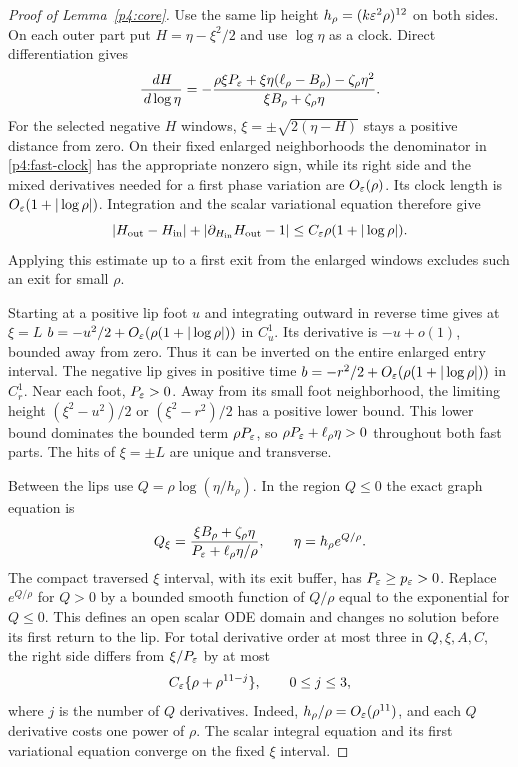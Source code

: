 \label{app:lower-core-proof}

\begin{proof}[Proof of Lemma~\ref{p4:core}]
Use the same lip height $h_\rho=(k\varepsilon^2\rho)^{12}$ on both sides.
On each outer part put $H=\eta-\xi^2/2$ and use $\log\eta$ as a clock.
Direct differentiation gives
\begin{equation}\label{p4:fast-clock}
 \frac{\,d H}{\,d\log\eta}
 =-\frac{\rho\xi P_\varepsilon+\xi\eta(\ell_\rho-B_\rho)
                    -\zeta_\rho\eta^2}
             {\xi B_\rho+\zeta_\rho\eta}.
\end{equation}
For the selected negative $H$ windows,
$\xi=\pm\sqrt{2(\eta-H)}$ stays a positive distance from zero.
On their fixed enlarged neighborhoods the denominator in
\eqref{p4:fast-clock} has the appropriate nonzero sign, while its
right side and the mixed derivatives needed for a first phase
variation are $O_\varepsilon(\rho)$. Its clock length is
$O_\varepsilon(1+|\log\rho|)$.
Integration and the scalar variational equation therefore give
\begin{equation}\label{p4:fast-error}
 |H_{\rm out}-H_{\rm in}|+
 |\partial_{H_{\rm in}}H_{\rm out}-1|
 \le C_\varepsilon\rho(1+|\log\rho|).
\end{equation}
Applying this estimate up to a first exit from the enlarged windows
excludes such an exit for small $\rho$.

Starting at a positive lip foot $u$ and integrating outward in
reverse time gives at $\xi=L$
$b=-u^2/2+O_\varepsilon(\rho(1+|\log\rho|))$ in $C^1_u$.
Its derivative is $-u+o(1)$, bounded away from zero.
Thus it can be inverted on the entire enlarged entry interval.
The negative lip gives in positive time
$b=-r^2/2+O_\varepsilon(\rho(1+|\log\rho|))$ in $C^1_r$.
Near each foot, $P_\varepsilon>0$. Away from its small foot neighborhood,
the limiting height $(\xi^2-u^2)/2$ or $(\xi^2-r^2)/2$
has a positive lower bound. This lower bound dominates the bounded
term $\rho P_\varepsilon$, so $\rho P_\varepsilon+\ell_\rho\eta>0$
throughout both fast parts. The hits of $\xi=\pm L$ are unique
and transverse.

Between the lips use $Q=\rho\log(\eta/h_\rho)$. In the region
$Q\le0$ the exact graph equation is
\begin{equation}\label{p4:thin}
 Q_\xi=\frac{\xi B_\rho+\zeta_\rho\eta}
                 {P_\varepsilon+\ell_\rho\eta/\rho},
 \qquad \eta=h_\rho e^{Q/\rho}.
\end{equation}
The compact traversed $\xi$ interval, with its exit buffer, has
$P_\varepsilon\ge p_\varepsilon>0$.
Replace $e^{Q/\rho}$ for $Q>0$ by a bounded smooth function of
$Q/\rho$ equal to the exponential for $Q\le0$.
This defines an open scalar ODE domain and changes no solution
before its first return to the lip.
For total derivative order at most three in $Q,\xi,A,C$, the
right side differs from $\xi/P_\varepsilon$ by at most
\begin{equation}\label{p4:thin-error}
 C_\varepsilon\{\rho+\rho^{11-j}\},\qquad 0\le j\le3,
\end{equation}
where $j$ is the number of $Q$ derivatives. Indeed,
$h_\rho/\rho=O_\varepsilon(\rho^{11})$, and each $Q$ derivative
costs one power of $\rho$.
The scalar integral equation and its first variational equation converge
on the fixed $\xi$ interval.


\end{proof}
